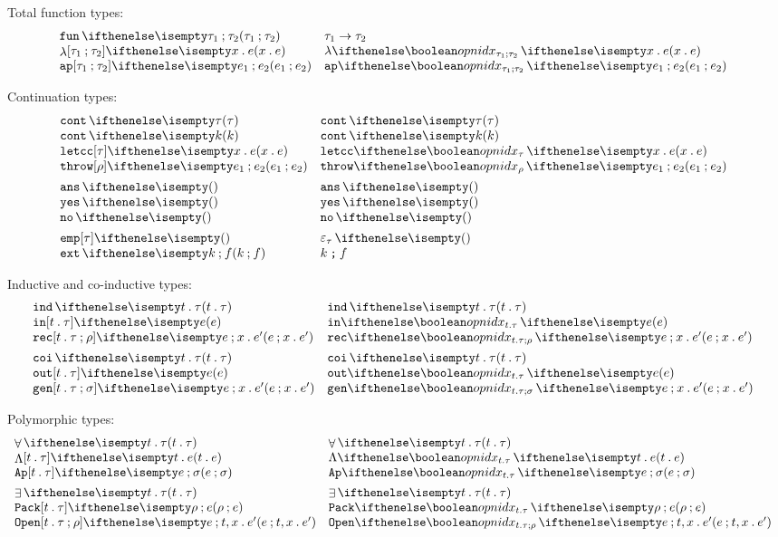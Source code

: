 \documentclass[11pt,twoside]{article}
\begin{document}
\noindent Total function types:
\begin{displaymath}
  \begin{array}{l@{\quad}l@{\quad}l}
    \arrTy{\tau_1}{\tau_2} & \arrTy*{\tau_1}{\tau_2} \\
    \lamEx{x}{e} & \lamEx*{x}{e} \\
    \appEx{e_1}{e_2} & \appEx*{e_1}{e_2}
  \end{array}
\end{displaymath}

\noindent Continuation types:
\begin{displaymath}
  \begin{array}{l@{\quad}l@{\quad}l}
    \contTy{\tau}     & \contTy*{\tau} \\
    \contEx{k}        & \contEx*{k} \\
    \letccEx[\tau]{x}{e} & \letccEx*{x}{e} \\
    \throwEx[\tau][\rho]{e_1}{e_2} & \throwEx*{e_1}{e_2} \\[1ex]

    \ansTy & \ansTy* \\
    \yesEx & \yesEx* \\
    \noEx & \noEx* \\[1ex]

    \empStk[\tau]     & \empStk*[\tau] \\
    \extStk{k}{f}     & \extStk*{k}{f} 
  \end{array}
\end{displaymath}

\noindent Inductive and co-inductive types:
\begin{displaymath}
  \begin{array}{l@{\quad}l@{\quad}l}
    \indTy{t}{\tau} & \indTy*{t}{\tau} \\
    \inEx[t][\tau]{e} & \inEx*{e} \\
    \recEx[t][\tau][\rho]{e}{x}{e'} & \recEx*{e}{x}{e'} \\[1ex]
    \coiTy{t}{\tau} & \coiTy*{t}{\tau} \\
    \outEx[t][\tau]{e} & \outEx*{e} \\
    \genEx[t][\tau][\sigma]{e}{x}{e'} & \genEx*{e}{x}{e'}
  \end{array}
\end{displaymath}

\noindent Polymorphic types:
\begin{displaymath}
  \begin{array}{l@{\quad}l@{\quad}l}
    \AllTy{t}{\tau} & \AllTy*{t}{\tau} \\
    \LamEx{t}[\tau]{e} & \LamEx*{t}{e} \\
    \AppEx[t][\tau]{e}{\sigma} & \AppEx*{e}{\sigma}\\[1ex]
    \SomeTy{t}{\tau}  & \SomeTy*{t}{\tau} \\
    \PackEx[t][\tau]{\rho}{e} & \PackEx*{\rho}{e} \\
    \OpenEx[t][\tau]{e}[\rho]{x}{e'} & \OpenEx*[t][\tau]{e}[\rho]{x}{e'}
  \end{array}
\end{displaymath}
\end{document}
